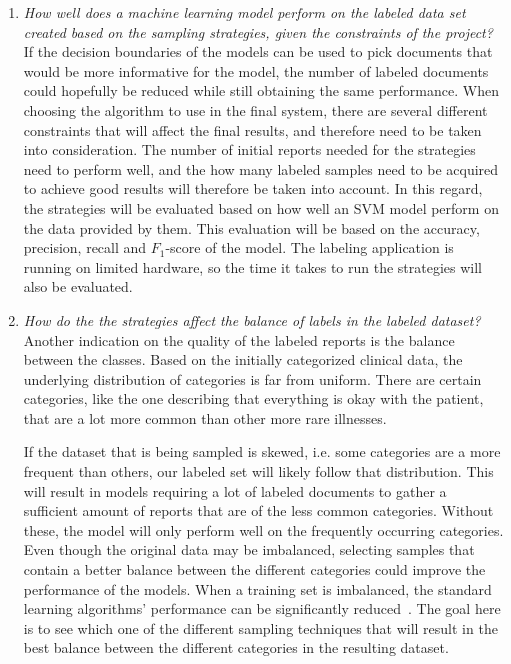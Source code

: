 \begin{enumerate}
      \item \label{intro:re-q1} 
      \textit{How well does a machine learning model perform on the labeled data set created based on the sampling strategies, given the constraints of the project?}
      \newline
      If the decision boundaries of the models can be used to pick documents that would be more informative for the model, the number of labeled documents could hopefully be reduced while still obtaining the same performance.
      When choosing the algorithm to use in the final system, there are several different constraints that will affect the final results, and therefore need to be taken into consideration.
      The number of initial reports needed for the strategies need to perform well, and the how many labeled samples need to be acquired to achieve good results will therefore be taken into account.
      In this regard, the strategies will be evaluated based on how well an SVM model perform on the data provided by them.
      This evaluation will be based on the accuracy, precision, recall and $F_1$-score of the model.
      The labeling application is running on limited hardware, so the time it takes to run the strategies will also be evaluated.

      \item \label{intro:re-q2}
      \textit{How do the the strategies affect the balance of labels in the labeled dataset?}
      \newline
      Another indication on the quality of the labeled reports is the balance between the classes.
      Based on the initially categorized clinical data, the underlying distribution of categories is far from uniform.
      There are certain categories, like the one describing that everything is okay with the patient, that are a lot more common than other more rare illnesses.

      If the dataset that is being sampled is skewed, i.e. some categories are a more frequent than others, our labeled set will likely follow that distribution.
      This will result in models requiring a lot of labeled documents to gather a sufficient amount of reports that are of the less common categories.
      Without these, the model will only perform well on the frequently occurring categories.
      Even though the original data may be imbalanced, selecting samples that contain a better balance between the different categories could improve the performance of the models.
      When a training set is imbalanced, the standard learning algorithms' performance can be significantly reduced~\cite{he2009learning}.
      The goal here is to see which one of the different sampling techniques that will result in the best balance between the different categories in the resulting dataset.

\end{enumerate}

